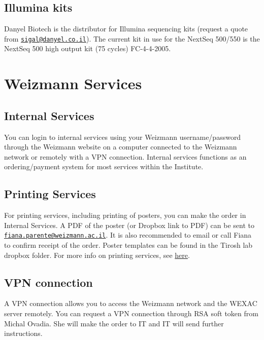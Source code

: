 \documentclass[]{book}
\begin{document}
\section{Illumina kits}\label{illumina-kits}

Danyel Biotech is the distributor for Illumina sequencing kits (request
a quote from
\href{mailto:sigal@danyel.co.il}{\nolinkurl{sigal@danyel.co.il}}). The
current kit in use for the NextSeq 500/550 is the NextSeq 500 high
output kit (75 cycles) FC-4-4-2005.

\chapter{Weizmann Services}\label{wisServices}

\section{Internal Services}\label{internal-services}

You can login to internal services using your Weizmann username/password
through the Weizmann website on a computer connected to the Weizmann
network or remotely with a VPN connection. Internal services functions
as an ordering/payment system for most services within the Institute.

\section{Printing Services}\label{printing-services}

For printing services, including printing of posters, you can make the
order in Internal Services. A PDF of the poster (or Dropbox link to PDF)
can be sent to
\href{mailto:fiana.parente@weizmann.ac.il}{\nolinkurl{fiana.parente@weizmann.ac.il}}.
It is also recommended to email or call Fiana to confirm receipt of the
order. Poster templates can be found in the Tirosh lab dropbox folder.
For more info on printing services, see
\href{https://www.weizmann.ac.il/RSD/units/design-photography-printing-branch/overview}{here}.

\section{VPN connection}\label{vpn-connection}

A VPN connection allows you to access the Weizmann network and the WEXAC
server remotely. You can request a VPN connection through RSA soft token
from Michal Ovadia. She will make the order to IT and IT will send
further instructions.
\end{document}
